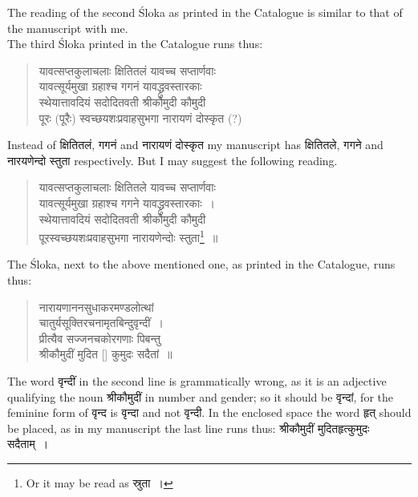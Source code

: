 \documentclass[11pt, openany]{book}
\begin{document}
\vspace{-2mm}
The reading of the second Śloka as printed in the Catalogue is similar to that of the manuscript with me. \\

\vspace{-2mm}
 The third Śloka printed in the Catalogue runs thus: 
\begin{quote}
    \qt 
     यावत्सप्तकुलाचलाः क्षितितलं यावच्च सप्तार्णवाः\\
 यावत्सूर्यमुखा ग्रहाश्च गगनं यावद्ध्रुवस्तारकाः\\
 स्थेयात्तावदियं सदोदितवती श्रीकौमुदी कौमुदी\textendash\\
 पूरः (पूरैः) स्वच्छयशःप्रवाहसुभगा नारायणं दोस्कृत (?)
\end{quote}

 Instead of क्षितितलं, गगनं and नारायणं दोस्कृत my manuscript 
has क्षितितले, गगने and नारयणेन्दो स्तुता respectively. But I may 
suggest the following reading. 
\begin{quote}
    \qt 
 यावत्सप्तकुलाचलाः क्षितितले यावच्च सप्तार्णवाः\\
 यावत्सूर्यमुखा ग्रहाश्च गगने यावद्ध्रुवस्तारकाः~। \\
 स्थेयात्तावदियं सदोदितवती श्रीकौमुदी कौमुदी\textendash\\
 पूरस्वच्छयशःप्रवाहसुभगा नारायणेन्दोः स्तुता\renewcommand{\thefootnote}{\fnsymbol{footnote}}\footnote[1]{Or it may be read as स्रुता~। }~॥     
\end{quote}
\newpage%

The Śloka, next to the above mentioned one, as printed 
in the Catalogue, runs thus: 
\begin{quote}
    \qt 
    नारायणाननसुधाकरमण्डलोत्थां\\
 चातुर्यसूक्तिरचनामृतबिन्दुवृन्दीं~। \\
 प्रीत्यैव सज्जनचकोरगणाः पिबन्तु\\
 श्रीकौमुदीं मुदित [\textendash ] कुमुदः सदैतां~॥~
\end{quote}
 
 The word वृन्दीं in the second line is grammatically wrong, 
as it is an adjective qualifying the noun श्रीकौमुदीं in number 
and gender; so it should be वृन्दां, for the feminine form of 
वृन्द is वृन्दा and not वृन्दी. In the enclosed space the word 
हृत् should be placed, as in my manuscript the last line runs 
thus: श्रीकौमुदीं मुदितहृत्कुमुदः सदैताम्~। \\
\end{document}
